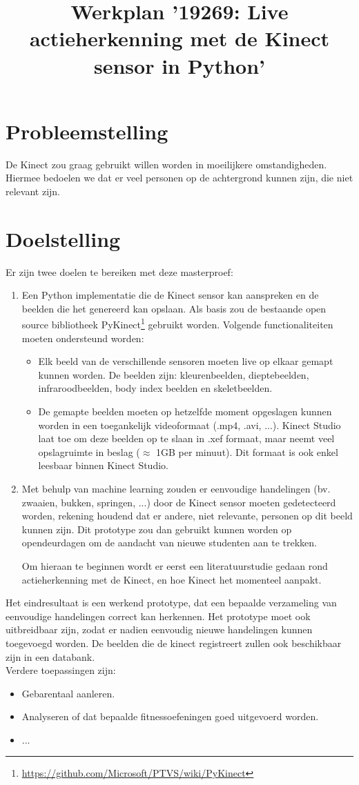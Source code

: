 \documentclass{article}
\title{Werkplan '19269: Live actieherkenning met de Kinect sensor in Python' }
\begin{document}
   \maketitle

   \section{Probleemstelling}
   De Kinect zou graag gebruikt willen worden in moeilijkere omstandigheden. Hiermee bedoelen we dat er veel personen op de achtergrond kunnen zijn, die niet relevant zijn.
   \section{Doelstelling}
   Er zijn twee doelen te bereiken met deze masterproef:
   \begin{enumerate}
    \item Een Python implementatie die de Kinect sensor kan aanspreken en de beelden die het genereerd kan opslaan. Als basis zou de bestaande open source bibliotheek PyKinect\footnote{\url{https://github.com/Microsoft/PTVS/wiki/PyKinect}} gebruikt worden. Volgende functionaliteiten moeten ondersteund worden:
    \begin{itemize}
      \item Elk beeld van de verschillende sensoren moeten live op elkaar gemapt kunnen worden. De beelden zijn: kleurenbeelden, dieptebeelden, infraroodbeelden, body index beelden en skeletbeelden.
      \item De gemapte beelden moeten op hetzelfde moment opgeslagen kunnen worden in een toegankelijk videoformaat (.mp4, .avi, ...). Kinect Studio laat toe om deze beelden op te slaan in .xef formaat, maar neemt veel opslagruimte in beslag ($\approx$ 1GB per minuut). Dit formaat is ook enkel leesbaar binnen Kinect Studio.
    \end{itemize}
    \item Met behulp van machine learning zouden er eenvoudige handelingen (bv. zwaaien, bukken, springen, ...) door de Kinect sensor moeten gedetecteerd worden, rekening houdend dat er andere, niet relevante, personen op dit beeld kunnen zijn.  Dit prototype zou dan gebruikt kunnen worden op opendeurdagen om de aandacht van nieuwe studenten aan te trekken.

    Om hieraan te beginnen wordt er eerst een literatuurstudie gedaan rond actieherkenning met de Kinect, en hoe Kinect het momenteel aanpakt.
   \end{enumerate}
   Het eindresultaat is een werkend prototype, dat een bepaalde verzameling van eenvoudige handelingen correct kan herkennen. Het prototype moet ook uitbreidbaar zijn, zodat er nadien eenvoudig nieuwe handelingen kunnen toegevoegd worden. De beelden die de kinect registreert zullen ook beschikbaar zijn in een databank.
   \\
   Verdere toepassingen zijn:
   \begin{itemize}
      \item Gebarentaal aanleren.
      \item Analyseren of dat bepaalde fitnessoefeningen goed uitgevoerd worden.
      \item ...
   \end{itemize}
\end{document}
